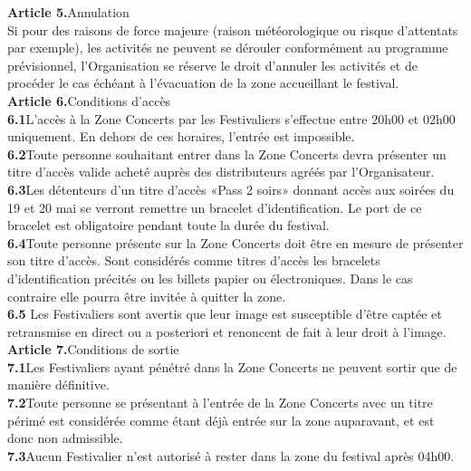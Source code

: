 \documentclass[hidelinks, paper=a4, fontsize=13pt]{report}
\begin{document}
\textbf{Article 5.}\hspace{3mm}Annulation\\
Si pour des raisons de force majeure (raison météorologique ou risque d'attentats par exemple), les activités ne peuvent se dérouler conformément au programme prévisionnel, l'Organisation se réserve le droit d’annuler les activités et de procéder le cas échéant à l’évacuation de la zone accueillant le festival.\\


\textbf{Article 6.}\hspace{3mm}Conditions d’accès\\
\textbf{6.1}\hspace{3mm}L’accès à la Zone Concerts par les Festivaliers s’effectue entre 20h00 et 02h00 uniquement. En dehors de ces horaires, l’entrée est impossible. \\
\textbf{6.2}\hspace{3mm}Toute personne souhaitant entrer dans la Zone Concerts devra présenter un titre d’accès valide acheté auprès des distributeurs agréés par l’Organisateur.\\
\textbf{6.3}\hspace{3mm}Les détenteurs d’un titre d’accès «Pass 2 soirs» donnant accès aux soirées du 19 et 20 mai se verront remettre un bracelet d’identification. Le port de ce bracelet est obligatoire pendant toute la durée du festival.\\
\textbf{6.4}\hspace{3mm}Toute personne présente sur la Zone Concerts doit être en mesure de présenter son titre d’accès. Sont considérés comme titres d’accès les bracelets d’identification précités ou les billets papier ou électroniques. Dans le cas contraire elle pourra être invitée à quitter la zone.\\
\textbf{6.5}\hspace{3mm} Les Festivaliers sont avertis que leur image est susceptible d'être captée et retransmise en direct ou a posteriori et renoncent de fait à leur droit à l'image.\\



\textbf{Article 7.}\hspace{3mm}Conditions de sortie\\
\textbf{7.1}\hspace{3mm}Les Festivaliers ayant pénétré dans la Zone Concerts ne peuvent sortir que de manière définitive. \\
\textbf{7.2}\hspace{3mm}Toute personne se présentant à l’entrée de la Zone Concerts avec un titre périmé est considérée comme étant déjà entrée sur la zone auparavant, et est donc non admissible.\\
\textbf{7.3}\hspace{3mm}Aucun Festivalier n’est autorisé à rester dans la zone du festival après 04h00. \\
\end{document}

